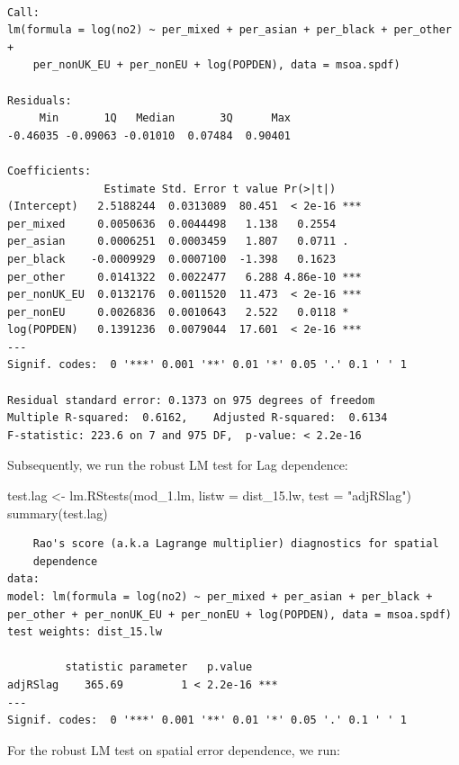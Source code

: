 \documentclass[
  letterpaper,
]{scrbook}
\newenvironment{Shaded}{\begin{snugshade}}{\end{snugshade}}
\newcommand{\AttributeTok}[1]{\textcolor[rgb]{0.40,0.45,0.13}{#1}}
\newcommand{\FunctionTok}[1]{\textcolor[rgb]{0.28,0.35,0.67}{#1}}
\newcommand{\NormalTok}[1]{\textcolor[rgb]{0.00,0.23,0.31}{#1}}
\newcommand{\OtherTok}[1]{\textcolor[rgb]{0.00,0.23,0.31}{#1}}
\newcommand{\StringTok}[1]{\textcolor[rgb]{0.13,0.47,0.30}{#1}}
\begin{document}
\begin{verbatim}

Call:
lm(formula = log(no2) ~ per_mixed + per_asian + per_black + per_other + 
    per_nonUK_EU + per_nonEU + log(POPDEN), data = msoa.spdf)

Residuals:
     Min       1Q   Median       3Q      Max 
-0.46035 -0.09063 -0.01010  0.07484  0.90401 

Coefficients:
               Estimate Std. Error t value Pr(>|t|)    
(Intercept)   2.5188244  0.0313089  80.451  < 2e-16 ***
per_mixed     0.0050636  0.0044498   1.138   0.2554    
per_asian     0.0006251  0.0003459   1.807   0.0711 .  
per_black    -0.0009929  0.0007100  -1.398   0.1623    
per_other     0.0141322  0.0022477   6.288 4.86e-10 ***
per_nonUK_EU  0.0132176  0.0011520  11.473  < 2e-16 ***
per_nonEU     0.0026836  0.0010643   2.522   0.0118 *  
log(POPDEN)   0.1391236  0.0079044  17.601  < 2e-16 ***
---
Signif. codes:  0 '***' 0.001 '**' 0.01 '*' 0.05 '.' 0.1 ' ' 1

Residual standard error: 0.1373 on 975 degrees of freedom
Multiple R-squared:  0.6162,    Adjusted R-squared:  0.6134 
F-statistic: 223.6 on 7 and 975 DF,  p-value: < 2.2e-16
\end{verbatim}

Subsequently, we run the robust LM test for Lag dependence:

\begin{Shaded}
\begin{Highlighting}[]
\NormalTok{test.lag }\OtherTok{\textless{}{-}} \FunctionTok{lm.RStests}\NormalTok{(mod\_1.lm, }
                       \AttributeTok{listw =}\NormalTok{ dist\_15.lw, }
                       \AttributeTok{test =} \StringTok{"adjRSlag"}\NormalTok{)}
\FunctionTok{summary}\NormalTok{(test.lag)}
\end{Highlighting}
\end{Shaded}

\begin{verbatim}
    Rao's score (a.k.a Lagrange multiplier) diagnostics for spatial
    dependence
data:  
model: lm(formula = log(no2) ~ per_mixed + per_asian + per_black +
per_other + per_nonUK_EU + per_nonEU + log(POPDEN), data = msoa.spdf)
test weights: dist_15.lw
 
         statistic parameter   p.value    
adjRSlag    365.69         1 < 2.2e-16 ***
---
Signif. codes:  0 '***' 0.001 '**' 0.01 '*' 0.05 '.' 0.1 ' ' 1
\end{verbatim}

For the robust LM test on spatial error dependence, we run:
\end{document}

